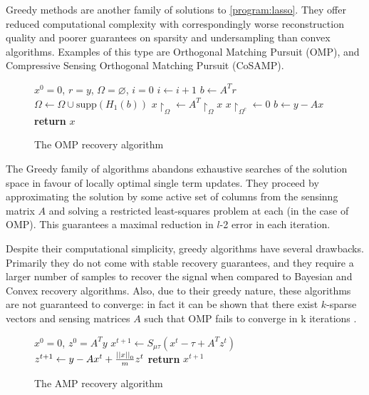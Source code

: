 \documentclass[12pt]{report}
\begin{document}

Greedy methods are another family of solutions to \ref{program:lasso}. They offer reduced computational complexity with correspondingly worse reconstruction quality and poorer guarantees on sparsity and undersampling than convex algorithms. Examples of this type are Orthogonal Matching Pursuit (OMP)\cite{tropp2007signal}, and Compressive Sensing Orthogonal Matching Pursuit (CoSAMP). 


\begin{figure}
\begin{algorithmic}[1]
\State $x^0 = 0$, $r=y$, $\Omega = \varnothing$, $i=0$
\State $i \gets i+1$
\State $b\gets A^Tr$
\State $\Omega \gets \Omega \cup \mathrm{supp}\left(H_1\left(b\right)\right)$
\State $x\restriction_{\Omega} \gets A^T\restriction_{\Omega}x$
\State $x\restriction_{\Omega^c} \gets 0$
\State $b \gets y - Ax$
\EndWhile
\State \textbf{return} $x$
\EndProcedure
\end{algorithmic}
\caption{The OMP recovery algorithm}\label{alg:omp}
\end{figure}

The Greedy family of algorithms abandons exhaustive searches of the solution space in favour of locally optimal single term updates. They proceed by approximating the solution by some active set of columns from the sensinng matrix \(A\) and solving a restricted least-squares problem at each (in the case of OMP). This guarantees a maximal reduction in \(l\)-2 error in each iteration.

Despite their computational simplicity, greedy algorithms have several drawbacks. Primarily they do not come with stable recovery guarantees, and they require a larger number of samples to recover the signal when compared to Bayesian and Convex recovery algorithms. Also, due to their greedy nature, these algorithms are not guaranteed to converge: in fact it can be shown that there exist \(k\)-sparse vectors and sensing matrices \(A\) such that OMP fails to converge in k iterations \cite{wen2013improved}.



\begin{figure}
\begin{algorithmic}[1]
\State $x^0 = 0$, $z^0=A^Ty$
\State $x^{t+1} \gets S_{\mu\tau}\left(x^t - \tau+ A^Tz^t\right) $
\State $z^{t+1} \gets y - Ax^t + \frac{\left|\left|x\right|\right|_0}{m}z^t$
\EndWhile
\State \textbf{return} $x^{t+1}$
\EndProcedure
\end{algorithmic}
\caption{The AMP recovery algorithm}\label{alg:amp}
\end{figure}
\end{document}

